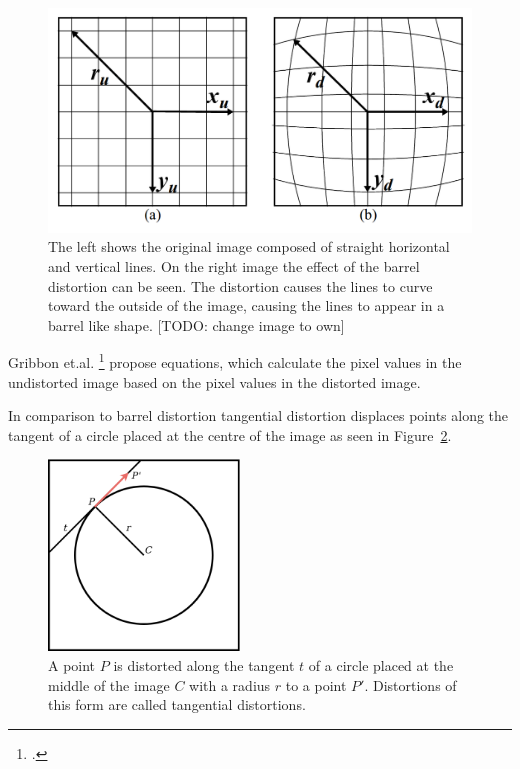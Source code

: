 \begin{figure}[h!]
	\centering
	\includegraphics[width=4.5in]{img/methodology_stereoCamera_distortion_barrelDistortion.png}
	\caption{The left shows the original image composed of straight horizontal and vertical lines. On the right image the effect of the barrel distortion can be seen. The distortion causes the lines to curve toward the outside of the image, causing the lines to appear in a barrel like shape. [TODO: change image to own]}
	\label{pic:methodology_stereoCamera_distortion_barrelDistortion}
\end{figure}

Gribbon et.al. \footcite{Gribbon_Barrel_Distortion_Correction_Algorithm} propose equations, which calculate the pixel values in the undistorted image based on the pixel values in the distorted image.

In comparison to barrel distortion tangential distortion displaces points along the tangent of a circle placed at the centre of the image as seen in Figure~\ref{pic:methodology_stereoCamera_distortion_tangentialDistortion}.

\begin{figure}[h!]
	\centering
	\includegraphics[width=2in]{img/methodology_stereoCamera_distortion_tangentialDistortion.png}
	\caption{A point $P$ is distorted along the tangent $t$ of a circle placed at the middle of the image $C$ with a radius $r$ to a point $P'$. Distortions of this form are called tangential distortions.}
	\label{pic:methodology_stereoCamera_distortion_tangentialDistortion}
\end{figure}


